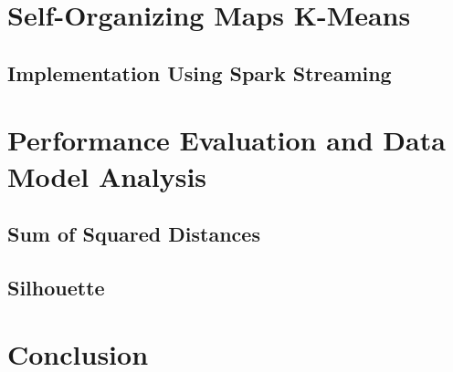 \documentclass{l4proj}
\begin{document}


\chapter{Self-Organizing Maps K-Means}
\label{som}

\section{Implementation Using Spark Streaming}



\chapter{Performance Evaluation and Data Model Analysis}
\label{eval}



\section{Sum of Squared Distances}

\section{Silhouette}


\chapter{Conclusion}
\label{conclusion}
\end{document}
